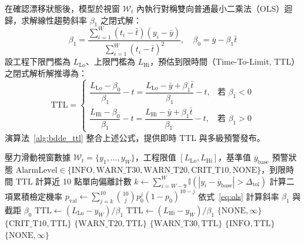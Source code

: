 \documentclass[fontset=none, a4paper, 12pt]{ctexart}
\begin{document}
\begin{doublespace}
在確認漂移狀態後，模型於視窗 $\mathcal{W}_t$ 內執行對稱雙向普通最小二乘法（OLS）迴歸，求解線性趨勢斜率 $\beta_1$ 之閉式解：
\begin{equation}
\beta_1 = \frac{\sum_{i=1}^W (t_i - \bar{t})(y_i - \bar{y})}{\sum_{i=1}^W (t_i - \bar{t})^2}, \quad \beta_0 = \bar{y} - \beta_1 \bar{t}
\label{eq:ols}
\end{equation}
設工程下限門檻為 $L_{\mathrm{Lo}}$、上限門檻為 $L_{\mathrm{Hi}}$，預估到限時間（Time-To-Limit, TTL）之閉式解析解推導為：
\begin{equation}
\mathrm{TTL} = 
\begin{cases}
\dfrac{L_{\mathrm{Lo}} - \beta_0}{\beta_1} - t = \dfrac{L_{\mathrm{Lo}} - \bar{y} + \beta_1 \bar{t}}{\beta_1} - t, & \text{若 } \beta_1 < 0 \\[10pt]
\dfrac{L_{\mathrm{Hi}} - \beta_0}{\beta_1} - t = \dfrac{L_{\mathrm{Hi}} - \bar{y} + \beta_1 \bar{t}}{\beta_1} - t, & \text{若 } \beta_1 > 0
\end{cases}
\label{eq:ttl}
\end{equation}
演算法~\ref{alg:bdde_ttl} 整合上述公式，提供即時 TTL 與多級預警發布。

\begin{algorithm}[H]
\caption{二項分佈時序漂移檢定與預警時間預測演算法 (B-DDE-TTL)}
\label{alg:bdde_ttl}
\begin{algorithmic}[1]
\Require 壓力滑動視窗數據 $\mathcal{W}_t=\{y_1, \dots, y_W\}$，工程限值 $[L_{\mathrm{Lo}}, L_{\mathrm{Hi}}]$，基準值 $\overline{y}_{\mathrm{base}}$
\Ensure 預警狀態 $\mathrm{AlarmLevel} \in \{\mathrm{INFO}, \mathrm{WARN\_T30}, \mathrm{WARN\_T20}, \mathrm{CRIT\_T10}, \mathrm{NONE}\}$，到限時間 $\mathrm{TTL}$
\State 計算近 10 點單向偏離計數 $k \leftarrow \sum_{i=W-9}^W \mathbb{I}(|y_i - \overline{y}_{\mathrm{base}}| > \Delta_{\mathrm{tol}})$
\State 計算二項累積檢定機率 $p_{\mathrm{val}} \leftarrow \sum_{j=k}^{10} \binom{10}{j} p_0^j (1-p_0)^{10-j}$
 
    \State 依式~\eqref{eq:ols} 計算斜率 $\beta_1$ 與截距 $\beta_0$
        \State $\mathrm{TTL} \leftarrow (L_{\mathrm{Lo}} - y_W) / \beta_1$
        \State $\mathrm{TTL} \leftarrow (L_{\mathrm{Hi}} - y_W) / \beta_1$
    \Else
        \State \Return $\{\mathrm{NONE}, \infty\}$
    \EndIf
        \State \Return $\{\mathrm{CRIT\_T10}, \mathrm{TTL}\}$
        \State \Return $\{\mathrm{WARN\_T20}, \mathrm{TTL}\}$
        \State \Return $\{\mathrm{WARN\_T30}, \mathrm{TTL}\}$
    \Else
        \State \Return $\{\mathrm{INFO}, \mathrm{TTL}\}$
    \EndIf
\EndIf
\State \Return $\{\mathrm{NONE}, \infty\}$
\end{algorithmic}
\end{algorithm}


\end{doublespace}
\end{document}
